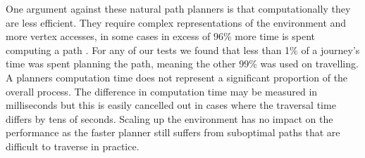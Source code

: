 \noindent
One argument against these natural path planners is that computationally they are less efficient. They require complex representations of the environment and more vertex accesses, in some cases in excess of 96\% more time is spent computing a path \cite{FIELD}. For any of our tests we found that less than 1\% of a journey's time was spent planning the path, meaning the other 99\% was used on travelling. A planners computation time does not represent a significant proportion of the overall process. The difference in computation time may be measured in milliseconds but this is easily cancelled out in cases where the traversal time differs by tens of seconds. Scaling up the environment has no impact on the performance as the faster planner still suffers from suboptimal paths that are difficult to traverse in practice.